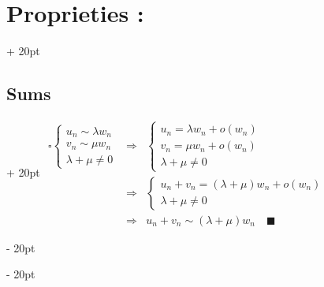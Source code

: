 \documentclass[a4paper, 12pt, twoside]{article}
\newcommand{\ind}[1][20pt]{\advance\leftskip + #1}
\newcommand{\deind}[1][20pt]{\advance\leftskip - #1}
\newenvironment{indentedenv}[1][20pt]{\par \ind[#1]}{\par \deind}
\newenvironment{indt}[2][20pt]{#2 \begin{indentedenv}[#1]}{\end{indentedenv}} %
\begin{document}
\begin{indt}{\section{Proprieties :}}
\begin{indt}{\subsection{Sums}}
            $\begin{array}{rcl}
                \square
                \begin{cases}
                    u_n \sim \lambda w_n
                    \\
                    v_n \sim \mu w_n
                    \\
                    \lambda + \mu \neq 0
                \end{cases}
                &\Rightarrow&
                \begin{cases}
                    u_n = \lambda w_n + o(w_n)
                    \\
                    v_n = \mu w_n + o(w_n)
                    \\
                    \lambda + \mu \neq 0
                \end{cases}
                \\
                &\Rightarrow&
                \begin{cases}
                    u_n + v_n = (\lambda + \mu)w_n + o(w_n)
                    \\
                    \lambda + \mu \neq 0
                \end{cases}
                \\
                &\Rightarrow&
                u_n + v_n \sim (\lambda + \mu)w_n
                \quad \blacksquare
            \end{array}$
            
        \end{indt}
        
    \end{indt}
    

    
    
\end{document}
